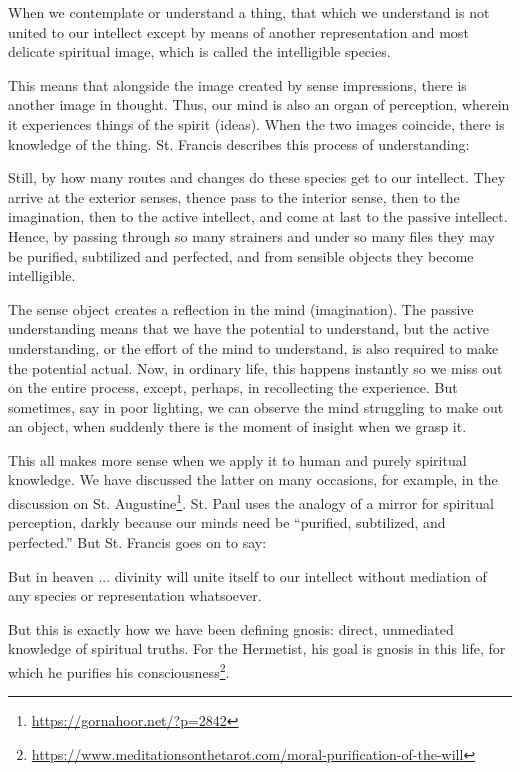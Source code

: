 \begin{quotex}
When we contemplate or understand a thing, that which we understand is not united to our intellect except by means of another representation and most delicate spiritual image, which is called the intelligible species.
\end{quotex}


This means that alongside the image created by sense impressions, there is another image in thought. Thus, our mind is also an organ of perception, wherein it experiences things of the spirit (ideas). When the two images coincide, there is knowledge of the thing. St. Francis describes this process of understanding:

\begin{quotex}
Still, by how many routes and changes do these species get to our intellect. They arrive at the exterior senses, thence pass to the interior sense, then to the imagination, then to the active intellect, and come at last to the passive intellect. Hence, by passing through so many strainers and under so many files they may be purified, subtilized and perfected, and from sensible objects they become intelligible.
\end{quotex}


The sense object creates a reflection in the mind (imagination). The passive understanding means that we have the potential to understand, but the active understanding, or the effort of the mind to understand, is also required to make the potential actual. Now, in ordinary life, this happens instantly so we miss out on the entire process, except, perhaps, in recollecting the experience. But sometimes, say in poor lighting, we can observe the mind struggling to make out an object, when suddenly there is the moment of insight when we grasp it.

This all makes more sense when we apply it to human and purely spiritual knowledge. We have discussed the latter on many occasions, for example, in the discussion on St. Augustine\footnote{\url{https://gornahoor.net/?p=2842}}. St. Paul uses the analogy of a mirror for spiritual perception, darkly because our minds need be ``purified, subtilized, and perfected.'' But St. Francis goes on to say:

\begin{quotex}
But in heaven ... divinity will unite itself to our intellect without mediation of any species or representation whatsoever.
\end{quotex}


But this is exactly how we have been defining gnosis: direct, unmediated knowledge of spiritual truths. For the Hermetist, his goal is gnosis in this life, for which he purifies his consciousness\footnote{\url{https://www.meditationsonthetarot.com/moral-purification-of-the-will}}.

